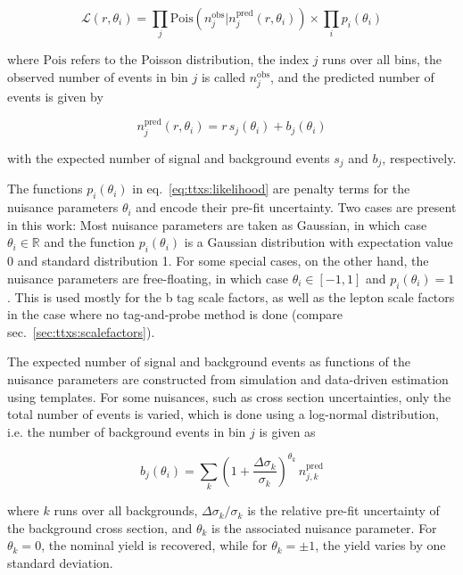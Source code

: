 \begin{equation}
\label{eq:ttxs:likelihood}
    \mathcal{L} (r, \theta_i) = \prod_j \mathrm{Pois} \left(n_j^{\text{obs}} | n_j^{\text{pred}} (r, \theta_i) \right) \times \prod_i p_i ( \theta_i )
\end{equation}

where $\mathrm{Pois}$ refers to the Poisson distribution, the index $j$ runs over all bins, the observed number of events in bin $j$ is called $n_j^{\text{obs}}$, and the predicted number of events is given by

\begin{equation}
    n_j^{\text{pred}} (r, \theta_i) = r \, s_j (\theta_i) + b_j (\theta_i)
\end{equation}

with the expected number of signal and background events $s_j$ and $b_j$, respectively. 

The functions $p_i ( \theta_i )$ in eq.~\ref{eq:ttxs:likelihood} are penalty terms for the nuisance parameters $\theta_i$ and encode their pre-fit uncertainty. Two cases are present in this work: Most nuisance parameters are taken as Gaussian, in which case $\theta_i \in \mathbb{R}$ and the function $p_i ( \theta_i )$ is a Gaussian distribution with expectation value 0 and standard distribution 1. For some special cases, on the other hand, the nuisance parameters are free-floating, in which case $\theta_i \in [-1,1]$ and $p_i ( \theta_i ) = 1$. This is used mostly for the b tag scale factors, as well as the lepton scale factors in the case where no tag-and-probe method is done (compare sec.~\ref{sec:ttxs:scalefactors}).

The expected number of signal and background events as functions of the nuisance parameters are constructed from simulation and data-driven estimation using templates. For some nuisances, such as cross section uncertainties, only the total number of events is varied, which is done using a log-normal distribution, i.e. the number of background events in bin $j$ is given as

\begin{equation}
    b_j (\theta_i) = \sum_k \left(1 + \frac{\Delta\sigma_k} {\sigma_k} \right)^{\theta_k} \, n_{j,k}^{\text{pred}}
\end{equation}

where $k$ runs over all backgrounds, $\Delta\sigma_k / \sigma_k$ is the relative pre-fit uncertainty of the background cross section, and $\theta_k$ is the associated nuisance parameter. For $\theta_k = 0$, the nominal yield is recovered, while for $\theta_k = \pm 1$, the yield varies by one standard deviation.

